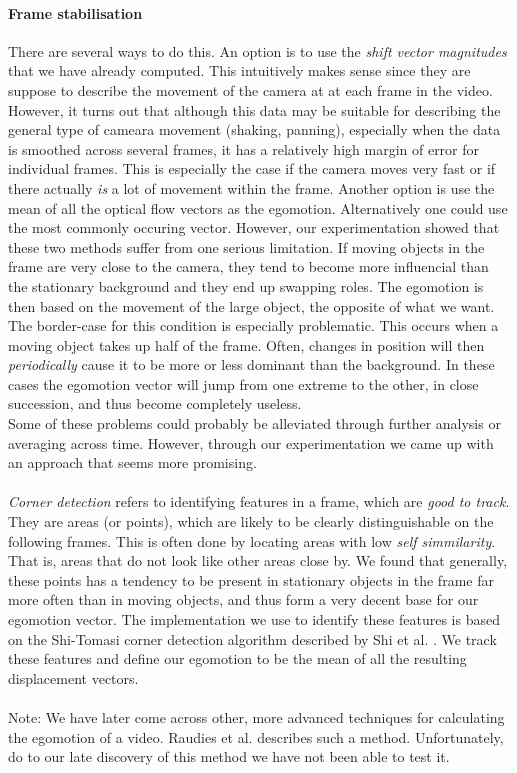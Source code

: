\paragraph{Frame stabilisation}
%
There are several ways to do this. An option is to use the \textit{shift vector magnitudes} that we have already computed. This intuitively makes sense since they are suppose to describe the movement of the camera at at each frame in the video. However, it turns out that although this data may be suitable for describing the general type of cameara movement (shaking, panning), especially when the data is smoothed across several frames, it has a relatively high margin of error for individual frames. This is especially the case if the camera moves very fast or if there actually \textit{is} a lot of movement within the frame. Another option is use the mean of all the optical flow vectors as the egomotion. Alternatively one could use the most commonly occuring vector. However, our experimentation showed that these two methods suffer from one serious limitation. If moving objects in the frame are very close to the camera, they tend to become more influencial than the stationary background and they end up swapping roles. The egomotion is then based on the movement of the large object, the opposite of what we want. The border-case for this condition is especially problematic. This occurs when a moving object takes up half of the frame. Often, changes in position will then \textit{periodically} cause it to be more or less dominant than the background. In these cases the egomotion vector will jump from one extreme to the other, in close succession, and thus become completely useless.\\
Some of these problems could probably be alleviated through further analysis or averaging across time. However, through our experimentation we came up with an approach that seems more promising.\\
\\
\textit{Corner detection} refers to identifying features in a frame, which are \textit{good to track}. They are areas (or points), which are likely to be clearly distinguishable on the following frames. This is often done by locating areas with low \textit{self simmilarity}. That is, areas that do not look like other areas close by. We found that generally, these points has a tendency to be present in stationary objects in the frame far more often than in moving objects, and thus form a very decent base for our egomotion vector. The implementation we use to identify these features is based on the Shi-Tomasi corner detection algorithm described by Shi et al. \cite{Shi_1994_3266}. We track these features and define our egomotion to be the mean of all the resulting displacement vectors.\\\\
%
Note: We have later come across other, more advanced techniques for calculating the egomotion of a video. Raudies et al. \cite{Raudies:2009:ELM:1612122.1612125} describes such a method. Unfortunately, do to our late discovery of this method we have not been able to test it.
%
